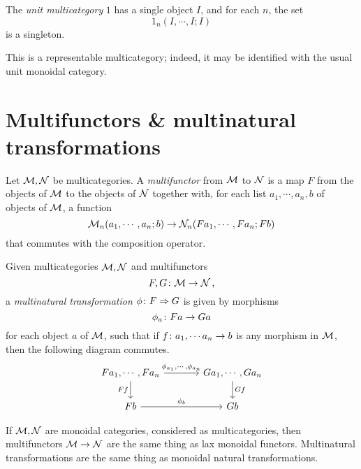 \begin{definition}
  The \emph{unit multicategory} $1$ has a single object $I$, and for each $n$, the set
  \[
    1_n(I,\cdots,I;I)
    \]
  is a singleton.

  This is a representable multicategory; indeed, it may be identified with the usual unit monoidal category.
\end{definition}

\section{Multifunctors \& multinatural transformations}

\begin{definition}
  Let $\mathcal M,\mathcal N$ be multicategories.  
  A \emph{multifunctor} from $\mathcal M$ to $\mathcal N$ is a map $F$ from the objects of $\mathcal M$ to the objects of $\mathcal N$ together with, for each list $a_1,\cdots,a_n,b$ of objects of $\mathcal M$, a function
  \[
    \mathcal M_n(a_1,\cdots,a_n;b) \to \mathcal N_n(F a_1,\cdots,F a_n; F b)
    \]
  that commutes with the composition operator.
\end{definition}
  
\begin{definition}
  Given multicategories $\mathcal M,\mathcal N$ and multifunctors 
  \[
    F,G\colon \mathcal M \to \mathcal N\,,
    \]
  a \emph{multinatural transformation} $\phi\colon F \Rightarrow G$ is given by morphisms 
  \[
    \phi_a \colon F a \to G a
    \]
  for each object $a$ of $\mathcal M$, such that if $f\colon a_1,\cdots a_n\to b$ is any morphism in $\mathcal M$, then the following diagram commutes.
  \[
    \begin{tikzcd}[column sep=36pt]
      Fa_1,\cdots, Fa_n \arrow[r, "{\phi_{a_1},\cdots,\phi_{a_n}}"] \arrow[d, "Ff"']
        & Ga_1,\cdots, Ga_n \arrow[d, "Gf"] \\
      Fb \arrow[r, "\phi_b"]
        & Gb
    \end{tikzcd}
    \]
\end{definition}

\begin{proposition}
  If $\mathcal M,\mathcal N$ are monoidal categories, considered as multicategories, then multifunctors $\mathcal M\to\mathcal N$ are the same thing as lax monoidal functors.  
  Multinatural transformations are the same thing as monoidal natural transformations.
\end{proposition}

